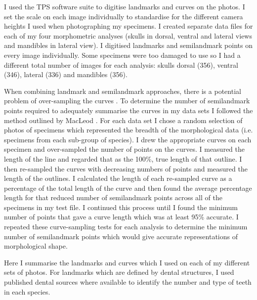 	I used the TPS software suite \citep{Rohlf2013} to digitise landmarks and curves on the photos. I set the scale on each image individually to standardise for the different camera heights I used when photographing my specimens. I created separate data files for each of my four morphometric analyses (skulls in dorsal, ventral and lateral views and mandibles in lateral view). I digitised landmarks and semilandmark points on every image individually. Some specimens were too damaged to use so I had a different total number of images for each analysis: skulls dorsal (356), ventral (346), lateral (336) and mandibles (356).

	When combining landmark and semilandmark approaches, there is a potential problem of over-sampling the curves \citep{MacLeod2012}. To determine the number of semilandmark points required to adequately summarise the curves in my data sets I followed the method outlined by MacLeod \citeyearpar{MacLeod2012}. For each data set I chose a random selection of photos of specimens which represented the breadth of the morphological data (i.e. specimens from each sub-group of species). I drew the appropriate curves on each specimen and over-sampled the number of points on the curves. I measured the length of the line and regarded that as the 100\%, true length of that outline. I then re-sampled the curves with decreasing numbers of points and measured the length of the outlines. I calculated the length of each re-sampled curve as a percentage of the total length of the curve and then found the average percentage length for that reduced number of semilandmark points across all of the specimens in my test file. I continued this process until I found the minimum number of points that gave a curve length which was at least 95\% accurate.  I repeated these curve-sampling tests for each analysis to determine the minimum number of semilandmark points which would give accurate representations of morphological shape.
	
	Here I summarise the landmarks and curves which I used on each of my different sets of photos. For landmarks which are defined by dental structures, I used published dental sources \citep{Repenning1967, Eisenberg1969, Nowak1983, MacPhee1987, KnoxJones1992, Davis1997, Querouil2001, Nagorsen2002, Wilson2005, Goodman2006, Karatas2007, Hoffmann2008, Asher2008,  Muldoon2009, Lin2010} where available to identify the number and type of teeth in each species.
	
